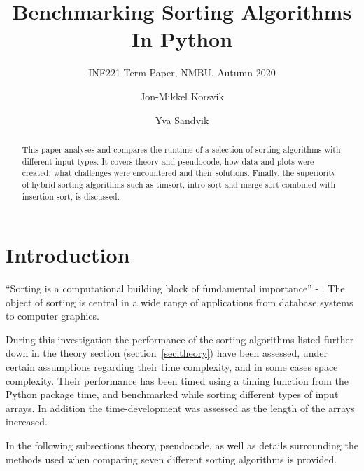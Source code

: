 \documentclass[sigconf, nonacm, natbib, screen, balance=False]{acmart}
\begin{document}
\pagestyle{plain}

\title{Benchmarking Sorting Algorithms In Python}
\subtitle{INF221 Term Paper, NMBU, Autumn 2020}

\author{Jon-Mikkel Korsvik}
\affiliation{}  %

\author{Yva Sandvik}

\begin{abstract}
  This paper analyses and compares the runtime of a selection of sorting algorithms with different input types. It covers theory and pseudocode, how data and plots were created, what challenges were encountered and their solutions. Finally, the superiority of hybrid sorting algorithms such as timsort, intro sort and merge sort combined with insertion sort, is discussed. 
\end{abstract}

\maketitle

\section{Introduction}\label{sec:intro}
``Sorting is a computational building block of fundamental importance'' - \cite{Designin28:online}. The object of sorting is central in a wide range of applications from database systems to computer graphics.

During this investigation the performance of the sorting algorithms listed further down in the theory section (section~\ref{sec:theory}) have been assessed, under certain assumptions regarding their time complexity, and in some cases space complexity. Their performance has been timed using a timing function from the Python package time, and benchmarked while sorting different types of input arrays. In addition the time-development was assessed as the length of the arrays increased.

In the following subsections theory, pseudocode, as well as details surrounding the methods used when comparing seven different sorting algorithms is provided.
\end{document}

